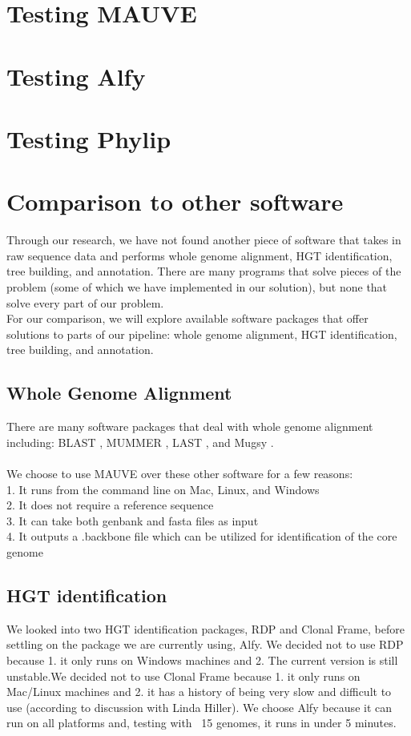 \documentclass[12pt]{article}
\newcommand{\tab}{\hspace*{3em}}
\begin{document}
\section{Testing MAUVE}

\section{Testing Alfy}

\section{Testing Phylip}

\section{Comparison to other software}
\tab Through our research, we have not found another piece of software that takes in raw sequence data and performs whole genome alignment, HGT identification, tree building, and annotation. There are many programs that solve pieces of the problem (some of which we have implemented in our solution), but none that solve every part of our problem. \\
\tab For our comparison, we will explore available software packages that offer solutions to parts of our pipeline: whole genome alignment, HGT identification, tree building, and annotation.\\
\subsection{Whole Genome Alignment}
There are many software packages that deal with whole genome alignment including: BLAST \cite{Blast}, MUMMER \cite{Mummer}, LAST \cite{Last}, and Mugsy \cite{Mugsy}.\\
\\
We choose to use MAUVE \cite{mauve} over these other software for a few reasons:\\
\tab 1. It runs from the command line on Mac, Linux, and Windows\\
\tab 2. It does not require a reference sequence\\
\tab 3. It can take both genbank and fasta files as input\\
\tab 4. It outputs a .backbone file which can be utilized for identification of the core genome\\

\subsection{HGT identification}
\tab We looked into two HGT identification packages, RDP and Clonal Frame, before settling on the package we are currently using, Alfy. We decided not to use RDP \cite{RDP} because 1. it only runs on Windows machines and 2. The current version is still unstable.We decided not to use Clonal Frame \cite{Clonal Frame} because 1. it only runs on Mac/Linux machines and 2. it has a history of being very slow and difficult to use (according to discussion with Linda Hiller). We choose Alfy \cite{Alfy} because it can run on all platforms and, testing with ~15 genomes, it runs in under 5 minutes.
\end{document}
